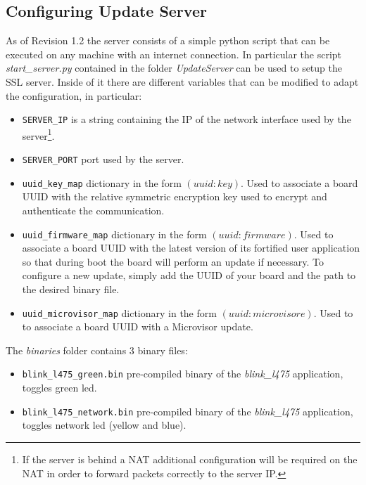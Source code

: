 \documentclass{article}
\begin{document}
\subsection{Configuring Update Server}
As of Revision 1.2 the server consists of a simple python script that can be executed on any machine with an internet connection. In particular the script \textit{start\_server.py} contained in the folder \textit{UpdateServer} can be used to setup the SSL server. Inside of it there are different variables that can be modified to adapt the configuration, in particular:
\begin{itemize}
	\item \verb|SERVER_IP| is a string containing the IP of the network interface used by the server\footnote{If the server is behind a NAT additional configuration will be required on the NAT in order to forward packets correctly to the server IP.}.
	\item \verb|SERVER_PORT| port used by the server.
	\item \verb|uuid_key_map| dictionary in the form $(uuid:key)$. Used to associate a board UUID with the relative symmetric encryption key used to encrypt and authenticate the communication.
	\item \verb|uuid_firmware_map| dictionary in the form $(uuid:firmware)$. Used to associate a board UUID with the latest version of its fortified user application so that during boot the board will perform an update if necessary. To configure a new update, simply add the UUID of your board and the path to the desired binary file.
	\item \verb|uuid_microvisor_map| dictionary in the form $(uuid:microvisore)$. Used to to associate a board UUID with a Microvisor update.
\end{itemize}
The \textit{binaries} folder contains 3 binary files:
\begin{itemize}
	\item \verb|blink_l475_green.bin| pre-compiled binary of the \textit{blink\_l475} application, toggles green led.
	\item \verb|blink_l475_network.bin| pre-compiled binary of the \textit{blink\_l475} application, toggles network led (yellow and blue).
\end{itemize}
\end{document}

